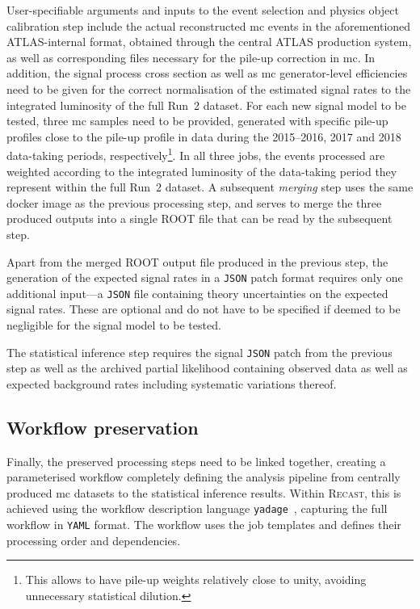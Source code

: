 User-specifiable arguments and inputs to the event selection and physics object calibration step include the actual reconstructed \gls{mc} events in the aforementioned ATLAS-internal format, obtained through the central ATLAS production system, as well as corresponding files necessary for the pile-up correction in \gls{mc}. 
In addition, the signal process cross section as well as \gls{mc} generator-level efficiencies need to be given for the correct normalisation of the estimated signal rates to the integrated luminosity of the full Run~2 dataset. 
For each new signal model to be tested, three \gls{mc} samples need to be provided, generated with specific pile-up profiles close to the pile-up profile in data during the 2015--2016, 2017 and 2018 data-taking periods, respectively\footnote{This allows to have pile-up weights relatively close to unity, avoiding unnecessary statistical dilution.}. 
In all three jobs, the events processed are weighted according to the integrated luminosity of the data-taking period they represent within the full Run~2 dataset. A subsequent \textit{merging} step uses the same docker image as the previous processing step, and serves to merge the three produced outputs into a single \textsc{ROOT} file that can be read by the subsequent step.

Apart from the merged \textsc{ROOT} output file produced in the previous step, the generation of the expected signal rates in a \texttt{JSON} patch format requires only one additional input---a \texttt{JSON} file containing theory uncertainties on the expected signal rates. These are optional and do not have to be specified if deemed to be negligible for the signal model to be tested.

The statistical inference step requires the signal \texttt{JSON} patch from the previous step as well as the archived partial likelihood containing observed data as well as expected background rates including systematic variations thereof. 

\subsection{Workflow preservation}

Finally, the preserved processing steps need to be linked together, creating a parameterised workflow completely defining the analysis pipeline from centrally produced \gls{mc} datasets to the statistical inference results. Within \textsc{Recast}, this is achieved using the workflow description language \texttt{yadage}~\cite{yadage:2017frf}, capturing the full workflow in \texttt{YAML} format. The workflow uses the job templates and defines their processing order and dependencies.

